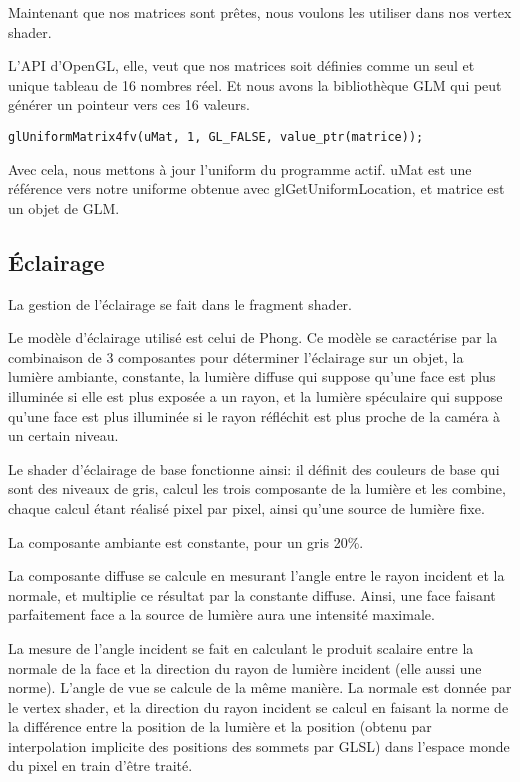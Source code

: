 \documentclass[11pt, a4paper, titlepage]{article}
\begin{document}
Maintenant que nos matrices sont prêtes, nous voulons les utiliser
dans nos vertex shader.

L'API d'OpenGL, elle, veut que nos matrices soit définies comme
un seul et unique tableau de 16 nombres réel. Et nous avons la
bibliothèque GLM qui peut générer un pointeur vers ces 16 valeurs.

\begin{lstlisting}
glUniformMatrix4fv(uMat, 1, GL_FALSE, value_ptr(matrice));
\end{lstlisting}

Avec cela, nous mettons à jour l'uniform du programme actif.
uMat est une référence vers notre uniforme obtenue avec glGetUniformLocation,
et matrice est un objet de GLM.

\subsection{Éclairage}

La gestion de l'éclairage se fait dans le fragment shader.

Le modèle d'éclairage utilisé est celui de Phong. Ce modèle se caractérise par
la combinaison de 3 composantes pour déterminer l'éclairage sur un objet,
la lumière ambiante, constante, la lumière diffuse qui suppose qu'une face
est plus illuminée si elle est plus exposée a un rayon, et la lumière spéculaire
qui suppose qu'une face est plus illuminée si le rayon réfléchit est plus proche
de la caméra à un certain niveau.

Le shader d'éclairage de base fonctionne ainsi: il définit des couleurs de base
qui sont des niveaux de gris, calcul les trois composante de la lumière et les combine,
chaque calcul étant réalisé pixel par pixel, ainsi qu'une source de lumière fixe.

La composante ambiante est constante, pour un gris 20\%.

La composante diffuse se calcule en mesurant l'angle entre le rayon incident et
la normale, et multiplie ce résultat par la constante diffuse. Ainsi, une face
faisant parfaitement face a la source de lumière aura une intensité maximale.

La mesure de l'angle incident se fait en calculant le produit scalaire entre la
normale de la face et la direction du rayon de lumière incident
(elle aussi une norme). L'angle de vue se calcule de la même manière.
La normale est donnée par le vertex shader, et la direction du rayon incident se
calcul en faisant la norme de la différence entre la position de la lumière et
la position (obtenu par interpolation implicite des positions des sommets par GLSL)
dans l'espace monde du pixel en train d'être traité.
\end{document}
